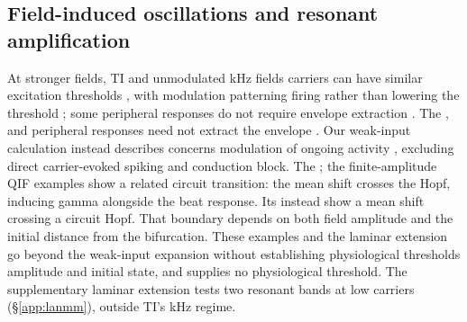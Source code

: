 \documentclass[11pt,a4paper]{article}
\providecommand{\DIFaddtex}[1]{{\protect\color{blue} \sf #1}} %
\providecommand{\DIFdeltex}[1]{{\protect\color{red} \scriptsize #1}} %
\providecommand{\DIFaddbegin}{} %
\providecommand{\DIFaddend}{} %
\providecommand{\DIFdelbegin}{} %
\providecommand{\DIFdelend}{} %
\providecommand{\DIFadd}[1]{\texorpdfstring{\DIFaddtex{#1}}{#1}} %
\providecommand{\DIFdel}[1]{\texorpdfstring{\DIFdeltex{#1}}{}} %
\begin{document}
\subsection{\DIFadd{Field-induced oscillations and resonant amplification}}
\DIFadd{At stronger fields, }\DIFaddend TI and unmodulated \DIFdelbegin \DIFdel{kHz fields }\DIFdelend \DIFaddbegin \DIFadd{carriers }\DIFaddend can have similar excitation
thresholds \DIFdelbegin \DIFdel{, with modulation patterning firing rather than lowering the threshold
\cite{opancar2025,semenov2025}; some peripheral responses do not
require envelope extraction \cite{peripheral2023}. The }\DIFdelend \DIFaddbegin \DIFadd{\cite{opancar2025,semenov2025}, and peripheral responses need not
extract the envelope \cite{peripheral2023}. Our }\DIFaddend weak-input calculation \DIFdelbegin \DIFdel{instead describes
}\DIFdelend \DIFaddbegin \DIFadd{concerns
}\DIFaddend modulation of ongoing activity \DIFdelbegin \DIFdel{\cite{vieira2024,missey2026}, excluding direct
carrier-evoked spiking and conduction block. The }\DIFdelend \DIFaddbegin \DIFadd{\cite{vieira2024}; the }\DIFaddend finite-amplitude
QIF examples \DIFdelbegin \DIFdel{show a related circuit transition: the mean shift crosses the Hopf, inducing
gamma alongside the beat response. Its }\DIFdelend \DIFaddbegin \DIFadd{instead show a mean shift crossing a circuit Hopf. That }\DIFaddend boundary
depends on \DIFdelbegin \DIFdel{both field amplitude and the initial distance from the bifurcation. These examples and the laminar extension go beyond the weak-input expansion without establishing physiological
thresholds}\DIFdelend \DIFaddbegin \DIFadd{amplitude and initial state, and supplies no physiological threshold.
The supplementary laminar extension tests two resonant bands at low carriers
(\S\ref{app:lanmm}), outside TI's kHz regime}\DIFaddend .
\end{document}

